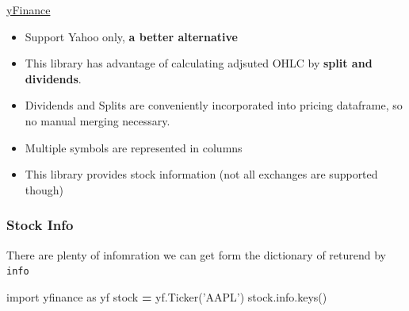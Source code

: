 \documentclass[
]{book}
\newenvironment{Shaded}{\begin{snugshade}}{\end{snugshade}}
\newcommand{\ImportTok}[1]{#1}
\newcommand{\NormalTok}[1]{#1}
\newcommand{\OperatorTok}[1]{\textcolor[rgb]{0.43,0.43,0.43}{\textbf{#1}}}
\newcommand{\StringTok}[1]{\textcolor[rgb]{0.5,0.5,0.5}{#1}}
\providecommand{\tightlist}{%
  \setlength{\itemsep}{0pt}\setlength{\parskip}{0pt}}
\begin{document}
\href{https://github.com/ranaroussi/yfinance}{yFinance}

\begin{itemize}
\tightlist
\item
  Support Yahoo only, \textbf{a better alternative}\\
\item
  This library has advantage of calculating adjsuted OHLC by \textbf{split and dividends}.
\item
  Dividends and Splits are conveniently incorporated into pricing dataframe, so no manual merging necessary.\\
\item
  Multiple symbols are represented in columns\\
\item
  This library provides stock information (not all exchanges are supported though)
\end{itemize}

\hypertarget{stock-info}{%
\subsubsection{Stock Info}\label{stock-info}}

There are plenty of infomration we can get form the dictionary of returend by \texttt{info}

\begin{Shaded}
\begin{Highlighting}[]
\ImportTok{import}\NormalTok{ yfinance }\ImportTok{as}\NormalTok{ yf}
\NormalTok{stock }\OperatorTok{=}\NormalTok{ yf.Ticker(}\StringTok{'AAPL'}\NormalTok{)}
\NormalTok{stock.info.keys()}
\end{Highlighting}
\end{Shaded}
\end{document}
